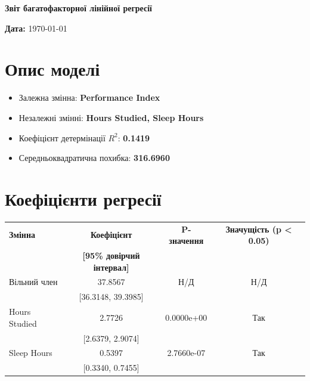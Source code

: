 \documentclass{article}
\begin{document}
    \begin{center}
    \Large\textbf{Звіт багатофакторної лінійної регресії}
    \end{center}

    \vspace{1cm}

    \textbf{Дата:} \today

    \vspace{0.5cm}

    \section{Опис моделі}

    \begin{itemize}
       \item Залежна змінна: \textbf{Performance Index}
       \item Незалежні змінні: \textbf{Hours Studied, Sleep Hours}
       \item Коефіцієнт детермінації $R^2$: \textbf{0.1419}
       \item Середньоквадратична похибка: \textbf{316.6960}
    \end{itemize}

    \vspace{0.5cm}

    \section{Коефіцієнти регресії}

   \renewcommand{\arraystretch}{1.5} %
    \begin{center}
    \begin{tabular}{lccc}
    \toprule
    \textbf{Змінна} & \textbf{Коефіцієнт} & \textbf{P-значення} & \textbf{Значущість (p < 0.05)} \\
     & \textbf{[95\% довірчий інтервал]} & & \\
    \midrule
    Вільний член & 37.8567 & Н/Д & Н/Д \\
     & [36.3148, 39.3985] & & \\
    Hours Studied & 2.7726 & 0.0000e+00 & Так \\
 & [2.6379, 2.9074] & & \\
Sleep Hours & 0.5397 & 2.7660e-07 & Так \\
 & [0.3340, 0.7455] & & \\

    \bottomrule
    \end{tabular}
    \end{center}
\end{document}
